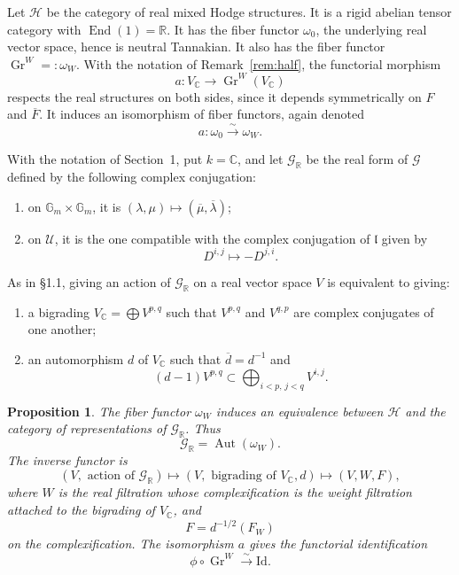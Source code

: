 \documentclass[11pt]{article}
\newtheorem{proposition}{Proposition}[section]
\newcommand{\Gr}{\operatorname{Gr}}
\newcommand{\Aut}{\operatorname{Aut}}
\newcommand{\End}{\operatorname{End}}
\newcommand{\Gm}{\mathbb G_m}
\begin{document}
Let \(\mathcal H\) be the category of real mixed Hodge structures.  It is a rigid abelian tensor category with \(\End(1)=\mathbb R\).  It has the fiber functor \(\omega_0\), the underlying real vector space, hence is neutral Tannakian.  It also has the fiber functor \(\Gr^W=:\omega_W\).  With the notation of Remark~\ref{rem:half}, the functorial morphism
\[
   a:V_\mathbb C\longrightarrow \Gr^W(V_\mathbb C)
\]
respects the real structures on both sides, since it depends symmetrically on \(F\) and \(\overline F\).  It induces an isomorphism of fiber functors, again denoted
\[
   a:\omega_0\xrightarrow{\sim}\omega_W.
\]

With the notation of Section~1, put \(k=\mathbb C\), and let \(\mathcal G_\mathbb R\) be the real form of \(\mathcal G\) defined by the following complex conjugation:
\begin{enumerate}[label=(\alph*)]
\item on \(\Gm\times\Gm\), it is \((\lambda,\mu)\mapsto(\overline\mu,\overline\lambda)\);
\item on \(\mathcal U\), it is the one compatible with the complex conjugation of \(\mathfrak l\) given by
\[
   D^{i,j}\longmapsto -D^{j,i}.
\]
\end{enumerate}
As in \S1.1, giving an action of \(\mathcal G_\mathbb R\) on a real vector space \(V\) is equivalent to giving:
\begin{enumerate}[label=(\alph*)]
\item a bigrading \(V_\mathbb C=\bigoplus V^{p,q}\) such that \(V^{p,q}\) and \(V^{q,p}\) are complex conjugates of one another;
\item an automorphism \(d\) of \(V_\mathbb C\) such that \(\overline d=d^{-1}\) and
\[
   (d-1)V^{p,q}\subset\bigoplus_{i<p,\,j<q}V^{i,j}.
\]
\end{enumerate}

\begin{proposition}\label{prop:mhs}
The fiber functor \(\omega_W\) induces an equivalence between \(\mathcal H\) and the category of representations of \(\mathcal G_\mathbb R\).  Thus
\[
   \mathcal G_\mathbb R=\Aut(\omega_W).
\]
The inverse functor is
\[
 (V,\text{ action of }\mathcal G_\mathbb R)
 \longmapsto
 (V,\text{ bigrading of }V_\mathbb C, d)
 \longmapsto
 (V,W,F),
\]
where \(W\) is the real filtration whose complexification is the weight filtration attached to the bigrading of \(V_\mathbb C\), and
\[
   F=d^{-1/2}(F_W)
\]
on the complexification.  The isomorphism \(a\) gives the functorial identification
\[
   \phi\circ\Gr^W\xrightarrow{\sim}\mathrm{Id}.
\]
\end{proposition}
\end{document}
